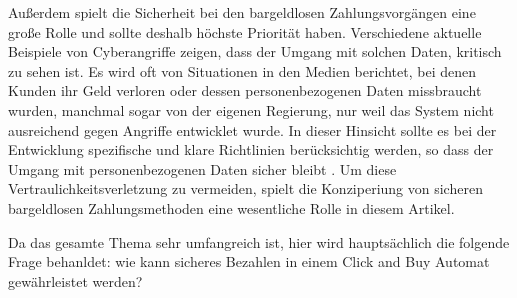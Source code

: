 Außerdem spielt die Sicherheit bei den bargeldlosen Zahlungsvorgängen eine große Rolle und sollte
deshalb höchste Priorität haben. Verschiedene aktuelle Beispiele von Cyberangriffe zeigen, dass der 
Umgang mit solchen Daten, kritisch zu sehen ist. Es wird oft von Situationen in den Medien berichtet,
bei denen Kunden ihr Geld verloren oder dessen personenbezogenen Daten missbraucht wurden, manchmal 
sogar von der eigenen Regierung, nur weil das System nicht ausreichend gegen Angriffe entwicklet wurde.
In dieser Hinsicht sollte es bei der Entwicklung spezifische und klare Richtlinien berücksichtig werden,
so dass der Umgang mit personenbezogenen Daten sicher bleibt \cite{refart:TRVR}. Um diese 
Vertraulichkeitsverletzung zu vermeiden, spielt die Konziperiung von sicheren bargeldlosen Zahlungsmethoden 
eine wesentliche Rolle in diesem Artikel. 

Da das gesamte Thema sehr umfangreich ist, hier wird hauptsächlich die folgende Frage behanldet: 
wie kann sicheres Bezahlen in einem Click and Buy Automat gewährleistet werden?